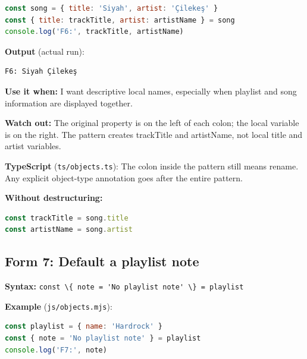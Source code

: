 \documentclass[
  10pt,
  a4paper,
  titlepage]{article}
\newcommand{\passthrough}[1]{#1}
\begin{document}
\Needspace{51.5pt}
\begin{lstlisting}[language=JavaScript]
const song = { title: 'Siyah', artist: 'Çilekeş' }
const { title: trackTitle, artist: artistName } = song
console.log('F6:', trackTitle, artistName)
\end{lstlisting}


\textbf{Output} (actual run):

\Needspace{30.9pt}
\begin{lstlisting}
F6: Siyah Çilekeş
\end{lstlisting}

\textbf{Use it when:} I want descriptive local names, especially when
playlist and song information are displayed together.

\textbf{Watch out:} The original property is on the left of each colon;
the local variable is on the right. The pattern creates trackTitle and
artistName, not local title and artist variables.

\textbf{TypeScript} (\passthrough{\lstinline!ts/objects.ts!}): The colon
inside the pattern still means rename. Any explicit object-type
annotation goes after the entire pattern.


\textbf{Without destructuring:}

\Needspace{41.2pt}
\begin{lstlisting}[language=JavaScript]
const trackTitle = song.title
const artistName = song.artist
\end{lstlisting}

\subsection{Form 7: Default a playlist
note}\label{form-7-default-a-playlist-note}

\textbf{Syntax:}
\passthrough{\lstinline!const \{ note = 'No playlist note' \} = playlist!}


\textbf{Example} (\passthrough{\lstinline!js/objects.mjs!}):

\Needspace{51.5pt}
\begin{lstlisting}[language=JavaScript]
const playlist = { name: 'Hardrock' }
const { note = 'No playlist note' } = playlist
console.log('F7:', note)
\end{lstlisting}

\end{document}
